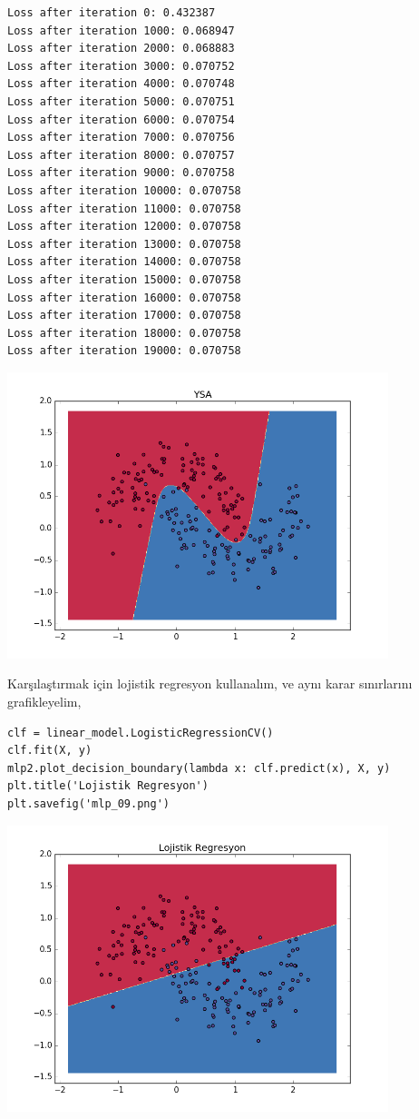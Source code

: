 \documentclass[12pt,fleqn]{article}\usepackage{../../common}
\begin{document}
\begin{verbatim}
Loss after iteration 0: 0.432387
Loss after iteration 1000: 0.068947
Loss after iteration 2000: 0.068883
Loss after iteration 3000: 0.070752
Loss after iteration 4000: 0.070748
Loss after iteration 5000: 0.070751
Loss after iteration 6000: 0.070754
Loss after iteration 7000: 0.070756
Loss after iteration 8000: 0.070757
Loss after iteration 9000: 0.070758
Loss after iteration 10000: 0.070758
Loss after iteration 11000: 0.070758
Loss after iteration 12000: 0.070758
Loss after iteration 13000: 0.070758
Loss after iteration 14000: 0.070758
Loss after iteration 15000: 0.070758
Loss after iteration 16000: 0.070758
Loss after iteration 17000: 0.070758
Loss after iteration 18000: 0.070758
Loss after iteration 19000: 0.070758
\end{verbatim}

\includegraphics[width=30em]{mlp_08.png}

Karşılaştırmak için lojistik regresyon kullanalım, ve aynı karar
sınırlarını grafikleyelim,

\begin{verbatim}
clf = linear_model.LogisticRegressionCV()
clf.fit(X, y)
mlp2.plot_decision_boundary(lambda x: clf.predict(x), X, y)
plt.title('Lojistik Regresyon')
plt.savefig('mlp_09.png')
\end{verbatim}

\includegraphics[width=30em]{mlp_09.png}
\end{document}
